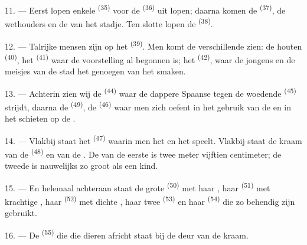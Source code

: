 11. --- Eerst lopen enkele  \textsuperscript{(35)} voor de
 \textsuperscript{(36)} uit lopen; daarna komen de
 \textsuperscript{(37)}, de wethouders en de
 van het stadje. Ten slotte lopen de
 \textsuperscript{(38)}.

\VUsaut{5.0mm}
\VUsaut{3.6mm}

12. --- Talrijke mensen zijn op het  \textsuperscript{(39)}. Men komt de
verschillende  zien: de houten  \textsuperscript{(40)}, het
 \textsuperscript{(41)} waar de voorstelling al begonnen is; het
 \textsuperscript{(42)}, waar de jongens en de meisjes van de stad het
genoegen van het  smaken.

13. --- Achterin zien wij de  \textsuperscript{(44)} waar de dappere Spaanse
 tegen de woedende  \textsuperscript{(45)} strijdt,
daarna de  \textsuperscript{(49)}, de 
\textsuperscript{(46)} waar men zich oefent in het gebruik van de  en in het
schieten op de
.

14. --- Vlakbij staat het  \textsuperscript{(47)} waarin men het
 en het  speelt. Vlakbij staat de kraam van de 
\textsuperscript{(48)} en van de . De
 van de eerste is twee meter vijftien centimeter; de tweede is
nauwelijks zo groot als een kind.

15. --- En helemaal achteraan staat de grote  \textsuperscript{(50)} met
haar , haar  \textsuperscript{(51)} met krachtige
, haar  \textsuperscript{(52)} met dichte , haar
twee  \textsuperscript{(53)} en haar  \textsuperscript{(54)}
die zo behendig zijn
 gebruikt.

16. --- De  \textsuperscript{(55)} die die dieren africht staat bij de deur van
de kraam.
\VUsaut{6.0mm}
\VUfilet{22mm}
